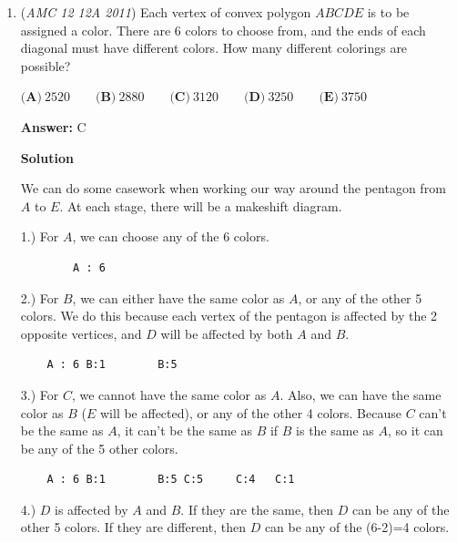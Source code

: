 \begin{enumerate}
 $\frac{2}{6} = \frac{x}{\sqrt{36 + x^2}} \implies \sqrt{36 + x^2} = 3x \implies 36 + x^2 = 9x^2 \implies x^2 = \frac{36}{8} = \frac{9}{2} \implies x = \frac{3\sqrt{2}}{2}$. Since this is only a half of the base of the isosceles triangle, we double $x$ to get

 $\boxed{\textbf{A}}$.

 


	\item (\textit{AMC 12 12A 2011}) Each vertex of convex polygon $ABCDE$ is to be assigned a color. There are $6$ colors to choose from, and the ends of each diagonal must have different colors. How many different colorings are possible?


 $\textbf{(A)}\ 2520 \qquad \textbf{(B)}\ 2880 \qquad \textbf{(C)}\ 3120 \qquad \textbf{(D)}\ 3250 \qquad \textbf{(E)}\ 3750$

 \textbf{Answer: }C



\textbf{Solution}

We can do some casework when working our way around the pentagon from $A$ to $E$. At each stage, there will be a makeshift diagram.

 1.) For $A$, we can choose any of the 6 colors.

 \begin{verbatim}
		A : 6
\end{verbatim}

2.) For $B$, we can either have the same color as $A$, or any of the other 5 colors. We do this because each vertex of the pentagon is affected by the 2 opposite vertices, and $D$ will be affected by both $A$ and $B$.

 \begin{verbatim}
	A : 6 B:1        B:5
\end{verbatim}

3.) For $C$, we cannot have the same color as $A$. Also, we can have the same color as $B$ ($E$ will be affected), or any of the other 4 colors. Because $C$ can't be the same as $A$, it can't be the same as $B$ if $B$ is the same as $A$, so it can be any of the 5 other colors.

 \begin{verbatim}
	A : 6 B:1        B:5 C:5     C:4   C:1
\end{verbatim}

4.) $D$ is affected by $A$ and $B$. If they are the same, then $D$ can be any of the other 5 colors. If they are different, then $D$ can be any of the (6-2)=4 colors.


\end{enumerate}
